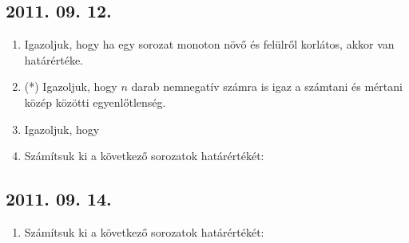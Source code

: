 \subsection*{2011. 09. 12.}
\begin{enumerate}
\item Igazoljuk, hogy ha egy sorozat monoton növő és felülről korlátos, akkor van határértéke.
\item (*) Igazoljuk, hogy $n$ darab nemnegatív számra is igaz a számtani és mértani közép közötti egyenlőtlenség.
\item Igazoljuk, hogy

\item Számítsuk ki a következő sorozatok határértékét:
\end{enumerate}

\subsection*{2011. 09. 14.}
\begin{enumerate}
	\item Számítsuk ki a következő sorozatok határértékét:
\end{enumerate}

